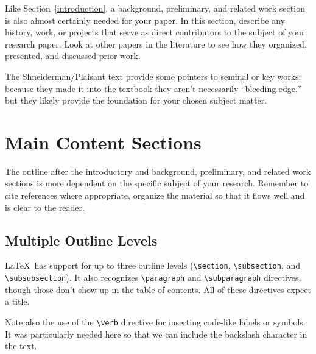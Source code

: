 \documentclass{article}
\begin{document}
Like Section~\ref{introduction}, a background, preliminary, and related work section is also almost certainly needed for your paper.  In this section, describe any history, work, or projects that serve as direct contributors to the subject of your research paper.  Look at other papers in the literature to see how they organized, presented, and discussed prior work.

The Shneiderman/Plaisant text \cite{dui} provide some pointers to seminal or key works; because they made it into the textbook they aren't necessarily ``bleeding edge,'' but they likely provide the foundation for your chosen subject matter.

\section{Main Content Sections}

The outline after the introductory and background, preliminary, and related work sections is more dependent on the specific subject of your research.  Remember to cite references where appropriate, organize the material so that it flows well and is clear to the reader.

\subsection{Multiple Outline Levels}

\LaTeX\ has support for up to three outline levels (\verb!\section!, \verb!\subsection!, and \verb!\subsubsection!).  It also recognizes \verb!\paragraph! and \verb!\subparagraph! directives, though those don't show up in the table of contents.  All of these directives expect a title.

Note also the use of the \verb!\verb! directive for inserting code-like labels or symbols.  It was particularly needed here so that we can include the backslash character in the text.
\end{document}
